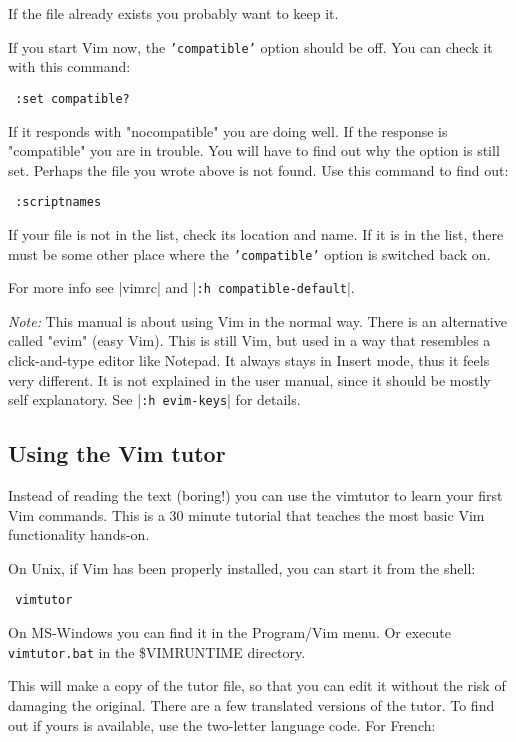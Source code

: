 If the file already exists you probably want to keep it.

If you start Vim now, the \texttt{'compatible'} option should be off.
You can check it with this command:

\begin{verbatim}
 :set compatible?
\end{verbatim}

If it responds with "nocompatible" you are doing well.
If the response is "compatible" you are in trouble.
You will have to find out why the option is still set.
Perhaps the file you wrote above is not found.
Use this command to find out:

\begin{verbatim}
 :scriptnames
\end{verbatim}

If your file is not in the list, check its location and name.
If it is in the list, there must be some other place where the \texttt{'compatible'} option is switched back on.

For more info see |vimrc| and |\texttt{:h compatible-default}|.

\textit{Note:}\newline
This manual is about using Vim in the normal way.
There is an alternative called "evim" (easy Vim).
This is still Vim, but used in a way that resembles a click-and-type editor like Notepad.
It always stays in Insert mode, thus it feels very different.
It is not explained in the user manual, since it should be mostly self explanatory.
See |\texttt{:h evim-keys}| for details.

\subsection{Using the Vim tutor}
\label{tutor}
\label{vimtutor}

Instead of reading the text (boring!) you can use the vimtutor to learn your first Vim commands.
This is a 30 minute tutorial that teaches the most basic Vim functionality hands-on.

On Unix, if Vim has been properly installed, you can start it from the shell:

\begin{verbatim}
 vimtutor
\end{verbatim}

On MS-Windows you can find it in the Program/Vim menu.
Or execute \texttt{vimtutor.bat} in the \$VIMRUNTIME directory.

This will make a copy of the tutor file, so that you can edit it without the risk of damaging the original.
There are a few translated versions of the tutor.
To find out if yours is available, use the two-letter language code.
For French:

